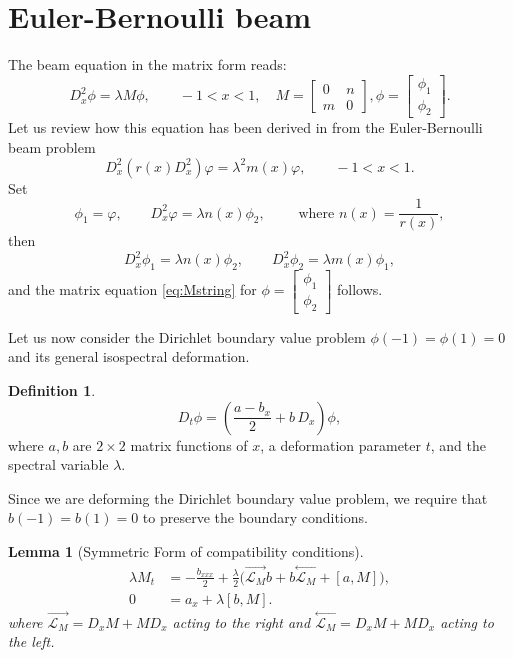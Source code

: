\documentclass[10pt,a4paper]{article}
\numberwithin{equation}{section}
\theoremstyle{plain}
\newtheorem{lemma}[lemma]{Lemma}
\theoremstyle{definition}
\newtheorem{definition}[definition]{Definition}
\newcommand{\InMb}{\stackrel{\leftarrow}{\mathcal{L}_{M}}}
\newcommand{\InMf}{\stackrel{\rightarrow}{\mathcal{L}_{M}}}
\begin{document}
\section{ Euler-Bernoulli beam} 
The beam equation in the matrix form reads: 
\begin{equation}\label{eq:Mstring}
D_x^2 \phi=\lambda M \phi, \qquad -1<x<1, \quad M=\begin{bmatrix}0&n\\m&0 \end{bmatrix}, 
\phi=\begin{bmatrix} \phi_1\\ \phi_2 \end{bmatrix}. 
\end{equation} 
Let us review how this equation has been derived in \cite{beals-szmigielski:2021p:2CH-euler-bernoulli-beam-noncommutative-continued-fractions} from the Euler-Bernoulli beam problem $$D_x^2(r(x) D_x^2) \varphi=\lambda^2 m(x) \varphi, \qquad -1<x<1.  $$  Set
\begin{equation} 
\phi_1=\varphi, \qquad D_x^2 \varphi=\lambda n(x) \phi_2, \qquad \text{ where } n(x)=\frac{1}{r(x)},  
\end{equation} 
then 
\begin{equation} 
D_x^2 \phi_1=\lambda n(x) \phi_2, \qquad D_x^2 \phi_2=\lambda m(x) \phi_1, 
\end{equation} 
and the matrix equation \eqref{eq:Mstring} for $\phi=\begin{bmatrix} \phi_1\\ \phi_2\end{bmatrix}$ follows.  

Let us now consider the Dirichlet boundary value problem $\phi(-1)=\phi(1)=0$ and its general isospectral deformation.  
\begin{definition} 
\begin{equation}\label{eq:t-flow-differential form} 
D_t \phi=(\frac{a-b_x}{2} +b\, D_x)\phi,  
\end{equation}
where $a,b$ are $2\times 2$ matrix functions of $x$, a deformation parameter $t$,  and the spectral variable $\lambda$.  
\end{definition} 
Since we are deforming the Dirichlet boundary value problem, we require that $b(-1)=b(1)=0$ to preserve the boundary conditions.  
\begin{lemma}[Symmetric Form of compatibility conditions] \label{lem:ZCC}
\begin{subequations}
\begin{align}
\lambda M_t&=-\frac{b_{xxx}}{2}+\frac{\lambda}{2}\big(\InMf b+b\InMb+
[a,M]\big), \label{eq:t-flow}\\
0&=a_x+\lambda[b,M]. \label{eq:constraints} 
\end{align}
\end{subequations}
where $\InMf=D_x M+MD_x$ acting to the right and $\InMb=D_x M+MD_x$ acting to the left.  
\end{lemma} 
\end{document}
